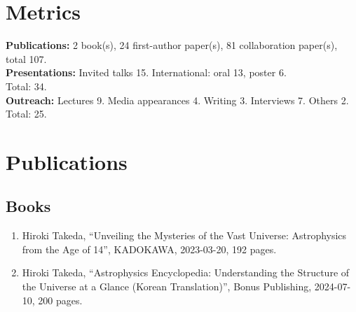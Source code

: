 \documentclass[uplatex, 12pt]{article}
\begin{document}
\section*{Metrics}

\noindent
\textbf{Publications:} 2 book(s), 24 first-author paper(s), 81 collaboration paper(s), total 107.\\

\noindent
\textbf{Presentations:} Invited talks 15. International: oral 13, poster 6.\\
\hspace{0.8cm}Total: 34. \\

\noindent
\textbf{Outreach:} Lectures 9. Media appearances 4. Writing 3. Interviews 7. Others 2.\\
\hspace{2.75cm}Total: 25. \\


\section*{Publications}
\subsection*{Books}
\begin{enumerate}
\item Hiroki Takeda, “Unveiling the Mysteries of the Vast Universe: Astrophysics from the Age of 14”, KADOKAWA, 2023-03-20, 192 pages.
\item Hiroki Takeda, “Astrophysics Encyclopedia: Understanding the Structure of the Universe at a Glance (Korean Translation)”, Bonus Publishing, 2024-07-10, 200 pages.
\end{enumerate}
\end{document}
